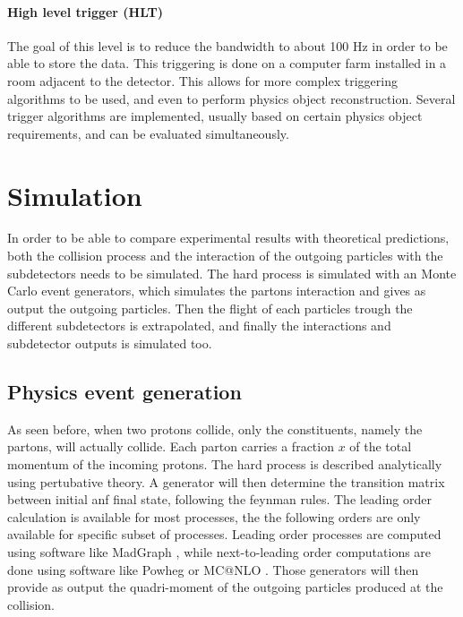 \paragraph{High level trigger (HLT)} The goal of this level is to reduce the bandwidth to about 100 Hz in order to be able to store the data. This triggering is done on a computer farm installed in a room adjacent to the detector. This allows for more complex triggering algorithms to be used, and even to perform physics object reconstruction. Several trigger algorithms are implemented, usually based on certain physics object requirements, and can be evaluated simultaneously.

\section{Simulation}

In order to be able to compare experimental results with theoretical predictions, both the collision process and the interaction of the outgoing particles with the subdetectors needs to be simulated. The hard process is simulated with an Monte Carlo event generators, which simulates the partons interaction and gives as output the outgoing particles. Then the flight of each particles trough the different subdetectors is extrapolated, and finally the interactions and subdetector outputs is simulated too.

\subsection{Physics event generation} 
\label{sec:cms_physics_event_generation}

As seen before, when two protons collide, only the constituents, namely the partons, will actually collide. Each parton carries a fraction $x$ of the total momentum of the incoming protons. The hard process is described analytically using pertubative theory. A generator will then determine the transition matrix between initial anf final state, following the feynman rules. The leading order calculation is available for most processes, the the following orders are only available for specific subset of processes. Leading order processes are computed using software like MadGraph \cite{Alwall2011}, while next-to-leading order computations are done using software like Powheg \cite{Alioli2010} or MC@NLO \cite{Frixione_2002}.
Those generators will then provide as output the quadri-moment of the outgoing particles produced at the collision.

